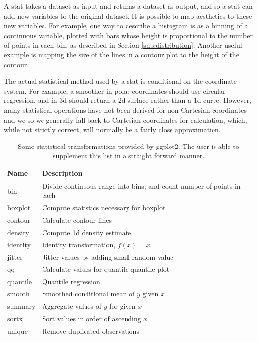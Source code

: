 A stat takes a dataset as input and returns a dataset as output, and so a stat can add new variables to the original dataset.  It is possible to map aesthetics to these new variables.  For example, one way to describe a histogram is as a binning of a continuous variable, plotted with bars whose height is proportional to the number of points in each bin, as described in Section \ref{sub:distribution}.  Another useful example is mapping the size of the lines in a contour plot to the height of the contour.

The actual statistical method used by a stat is conditional on the coordinate system.  For example, a smoother in polar coordinates should use circular regression, and in 3d should return a 2d surface rather than a 1d curve.  However, many statistical operations have not been derived for non-Cartesian coordinates and we so we generally fall back to Cartesian coordinates for calculation, which, while not strictly correct, will normally be a fairly close approximation.  

\begin{table}
  \begin{center}
  \begin{tabular}{l|l}
  Name & Description \\
  \hline
  bin & Divide continuous range into bins, and count number of points in each\\ 
  boxplot & Compute statistics necessary for boxplot\\
  contour & Calculate contour lines\\
  density & Compute 1d density estimate \\
  identity & Identity transformation, $f(x) = x$ \\
  jitter & Jitter values by adding small random value \\
  qq & Calculate values for quantile-quantile plot \\
  quantile & Quantile regression\\
  smooth & Smoothed conditional mean of $y$ given $x$ \\
  summary & Aggregate values of $y$ for given $x$ \\
  sortx & Sort values in order of ascending $x$\\
  unique & Remove duplicated observations\\
  \end{tabular}
  \end{center}
  \caption{Some statistical transformations provided by ggplot2.  The user is able to supplement this list in a straight forward manner.}
  \label{tbl:statistics}
\end{table}


